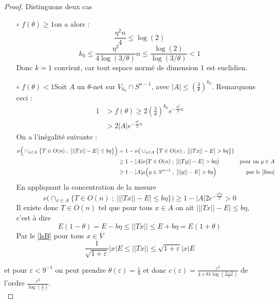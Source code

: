\documentclass[12pt]{article}
\theoremstyle{definition}
\begin{document}
\begin{proof}
	Distinguons deux cas 
	\begin{enumerate}[leftmargin=\labelsep]
		\item[$\circ$] {$f(\theta)\geq1$}\newline on a alors :
		\begin{equation*}
		\frac{\eta^2n}{4}\leq \log(2)
		\end{equation*}
		\begin{equation*}
		k_0\leq \frac{\eta^2}{4\log(3/\theta)}n\leq \frac{\log(2)}{\log(3/\theta)}<1
		\end{equation*}
		Donc $k=1$ convient, car tout espace normé de dimension 1 est euclidien.
		\item[$\circ$] $f(\theta)<1$\newline Soit $A$ un $\theta$-net sur $V_{k_0}\cap S^{n-1}$, avec $|A|\leq(\frac{3}{\theta})^{k_0}$. Remarquons ceci :
		\begin{align*}
		1&>f(\theta)\geq 2(\frac{3}{\theta})^{k_0}e^{-\frac{\eta^2}{2}n} \\
		&> 2|A|e^{-\frac{\eta^2}{2}n}
		\end{align*}
		On a l'inégalité suivante : 
		\begin{align*}
		\nu\Big(\cap_{x\in A}\big\{T\in O(n)\; ; \;  \big| ||Tx||-E \big|\leq b\eta\big\}\Big)& = 1-\nu\big(\cup_{x\in A}\big\{T\in O(n)\; ; \; \big| ||Tx||-E \big|>b\eta\big\}\big)& \\
		& \geq 1-|A|\nu\big(T\in O(n)\; ; \; \big| ||Ty||-E \big|>b\eta\big)& \text{pour un $y\in A$}\\
		& \geq 1 - |A|\mu\Big(y\in S^{n-1}\; ;\; \big| ||y||-E \big|>b\eta\Big) & \text{par le \cref{lhso}}
		\end{align*} 
		En appliquant la concentration de la mesure
		\begin{equation*}
		\nu\Big(\cap_{x\in A}\big\{T\in O(n)\; ; \;  \big| ||Tx||-E \big|\leq b\eta\big\}\Big)\geq 1 - |A|2e^{-\frac{\eta^2n}{2}} >0
		\end{equation*}	
		Il existe donc $T\in O(n)$ tel que pour tous $x\in A$ on ait $\big|||Tx||-E \big|\leq b \eta$, c'est à dire 
		\begin{equation*}
		E(1-\theta)=E-b\eta\leq ||Tx||\leq E+b\eta=E(1+\theta)
		\end{equation*}
		Par le \cref{lsB} pour tous $x\in V$
		\begin{equation*}
		\frac{1}{\sqrt{1+\varepsilon}}|x| E\leq ||Tx||\leq \sqrt{1+\varepsilon}|x| E
		\end{equation*}
	\end{enumerate}
	et pour $\varepsilon<9^{-1}$ on peut prendre $\theta(\varepsilon)=\frac{\varepsilon}{9}$ et donc $c(\varepsilon)=\frac{\varepsilon^2}{4\times 81\log(\frac{3\times9}{\varepsilon})} $ de l'ordre $\frac{\varepsilon^2}{\log(\frac{1}{\varepsilon})}$.\\ 
\end{proof}
\end{document}
